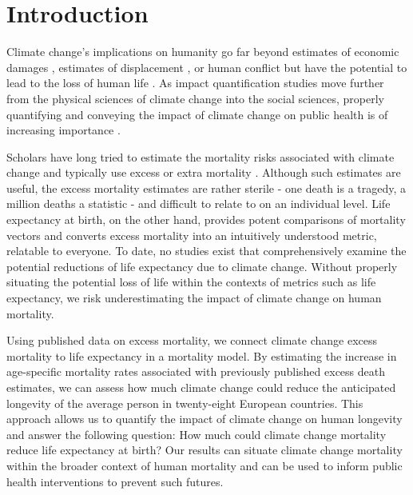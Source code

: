 \documentclass[12pt,]{article}
\begin{document}
\vskip 6.5pt


\noindent \doublespacing \section{Introduction}\label{introduction}

Climate change's implications on humanity go far beyond estimates of
economic damages \citep{hsiang2017estimatin}, estimates of displacement
\citep{nicholls2011sea, hauer2016millions, hauer2017migration}, or human
conflict \citep{barnett2007climate} but have the potential to lead to
the loss of human life
\citep{forzieri2017increasing, pachauri2014climate}. As impact
quantification studies move further from the physical sciences of
climate change into the social sciences, properly quantifying and
conveying the impact of climate change on public health is of increasing
importance \citep{melillo2014climate, cloyd2016engagement}.

Scholars have long tried to estimate the mortality risks associated with
climate change and typically use excess or extra mortality
\citep{forzieri2017increasing, wilson2017climate, mcmichael2006climate, zanobetti2012summer}.
Although such estimates are useful, the excess mortality estimates are
rather sterile - one death is a tragedy, a million deaths a statistic -
and difficult to relate to on an individual level. Life expectancy at
birth, on the other hand, provides potent comparisons of mortality
vectors and converts excess mortality into an intuitively understood
metric, relatable to everyone. To date, no studies exist that
comprehensively examine the potential reductions of life expectancy due
to climate change. Without properly situating the potential loss of life
within the contexts of metrics such as life expectancy, we risk
underestimating the impact of climate change on human mortality.

Using published data on excess mortality, we connect climate change
excess mortality to life expectancy in a mortality model. By estimating
the increase in age-specific mortality rates associated with previously
published excess death estimates, we can assess how much climate change
could reduce the anticipated longevity of the average person in
twenty-eight European countries. This approach allows us to quantify the
impact of climate change on human longevity and answer the following
question: How much could climate change mortality reduce life expectancy
at birth? Our results can situate climate change mortality within the
broader context of human mortality and can be used to inform public
health interventions to prevent such futures.
\end{document}
